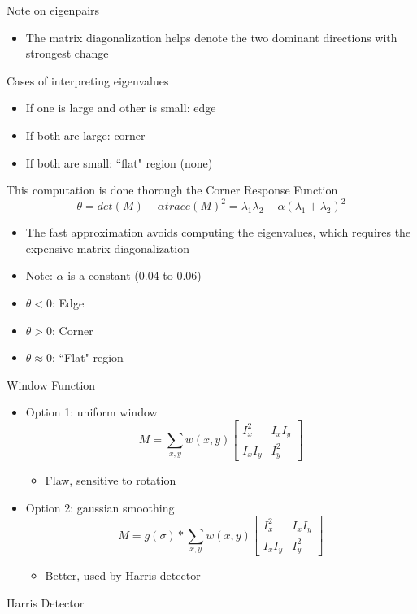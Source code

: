 Note on eigenpairs
\begin{itemize}
    \item The matrix diagonalization helps denote the two dominant directions with strongest change
\end{itemize}
Cases of interpreting eigenvalues
\begin{itemize}
    \item If one is large and other is small: edge
    \item If both are large: corner
    \item If both are small: ``flat" region (none)
\end{itemize}
This computation is done thorough the Corner Response Function
\[\theta=det(M)-\alpha trace(M)^2=\lambda_1\lambda_2-\alpha(\lambda_1+\lambda_2)^2\]
\begin{itemize}
    \item The fast approximation avoids computing the eigenvalues, which requires the expensive matrix diagonalization
    \item Note: $\alpha$ is a constant (0.04 to 0.06)
    \item $\theta<0$: Edge
    \item $\theta>0$: Corner
    \item $\theta\approx 0$: ``Flat" region
\end{itemize}
Window Function
\begin{itemize}
    \item Option 1: uniform window
    \[M=\sum_{x,y}w(x,y)\begin{bmatrix}
    I_x^2&I_xI_y\\I_xI_y&I_y^2
\end{bmatrix}\]
    \begin{itemize}
        \item Flaw, sensitive to rotation
    \end{itemize}
    \item Option 2: gaussian smoothing
    \[M= g(\sigma)*\sum_{x,y}w(x,y)\begin{bmatrix}
    I_x^2&I_xI_y\\I_xI_y&I_y^2
\end{bmatrix}\]
    \begin{itemize}
        \item Better, used by Harris detector
    \end{itemize}
\end{itemize}
Harris Detector
